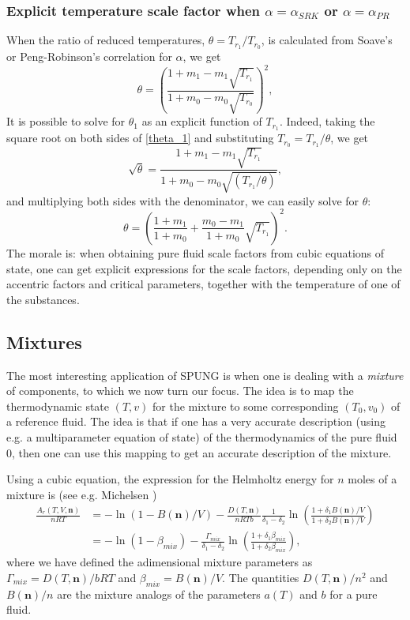 \documentclass[english]{../thermomemo/thermomemo}
\newcommand{\mbn}[0]{\mathbf n}
\newcommand{\lp}{\left(}
\newcommand{\rp}{\right)}
\numberwithin{equation}{section}
\begin{document}
\subsubsection*{Explicit temperature scale factor when $\alpha=\alpha_{SRK}$ or $\alpha=\alpha_{PR}$}
When the ratio of reduced temperatures, $\theta = T_{r_1}/T_{r_0}$, is
calculated from Soave's or Peng-Robinson's correlation for $\alpha$, we get
\begin{equation}
  \label{theta_1}
  \theta = \lp \frac{1+m_1-m_1 \sqrt{T_{r_1}}}{1+m_0-m_0
    \sqrt{T_{r_0}}} \rp^2,
\end{equation}
It is possible to solve for $\theta_1$ as an explicit function of
$T_{r_1}$. Indeed, taking the square root on both sides of \eqref{theta_1}
and substituting $T_{r_0} = T_{r_1}/\theta$, we get
$$
\sqrt{\theta} = \frac{1+m_1-m_1 \sqrt{T_{r_1}}}{1+m_0-m_0 \sqrt{(T_{r_1}/\theta)} },
$$
and multiplying both sides with the denominator, we can easily solve for $\theta$:
$$
\theta = \lp \frac{1+m_1}{1+m_0} + \frac{m_0-m_1}{1+m_0}
\sqrt{T_{r_1}} \rp^2.
$$
The morale is: when obtaining pure fluid scale factors from cubic equations of
state, one can get explicit expressions for the scale factors,
depending only on the accentric factors and critical parameters, together with the
temperature of one of the substances.

\subsection{Mixtures} %
The most interesting application of SPUNG is when one is dealing with a \textit{mixture} of components, to which we now turn our focus. The idea is to map the thermodynamic state $(T,v)$ for the mixture to some corresponding $(T_0,v_0)$ of a reference fluid. The idea is that if one has a very accurate description (using e.g. a multiparameter equation of state) of the thermodynamics of the pure fluid $0$, then one can use this mapping to get an accurate description of the mixture.

Using a cubic equation, the expression for the Helmholtz energy for
$n$ moles of a mixture is (see e.g. Michelsen \cite[p.105--107]{Michelsen07})
\begin{align*}
  \frac{A_r(T,V,\mbn)}{nRT} &= -\ln(1-B(\mbn)/V)-\frac{D(T,\mbn)}{nRTb}\frac{1}{\delta_1-\delta_2}\ln \lp \frac{1+\delta_1 B(\mbn)/V}{1+\delta_2 B(\mbn)/V} \rp \\[1.5pt]
  &= -\ln(1-\beta_{mix}) - \frac{\Gamma_{mix}}{\delta_1-\delta_2} \ln
  \lp \frac{1+\delta_1 \beta_{mix}}{1+\delta_2 \beta_{mix}} \rp,
\end{align*}
where we have defined the adimensional mixture parameters
as $\Gamma_{mix} = D(T,\mbn)/bRT$ and $\beta_{mix}=B(\mbn)/V$. The quantities
$D(T,\mbn)/n^2$ and $B(\mbn)/n$ are the mixture analogs of the parameters $a(T)$
and $b$ for a pure fluid.
\end{document}

